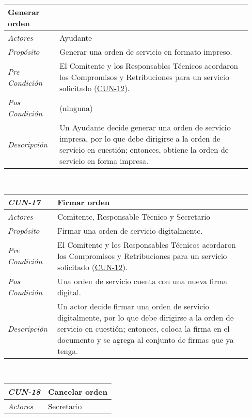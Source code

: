\begin{center}
{\begin{tabular}{ | p{3cm} | p{12.5cm} | }
	\hfil \textbf{Generar orden} \\
	\hline
	\raggedleft \textit{Actores} & Ayudante \\
	\hline
	\raggedleft \textit{Prop\'osito} & Generar una orden
	de servicio en formato impreso. \\
	\hline
	\raggedleft \textit{Pre Condici\'on} & El Comitente y
	los Responsables T\'ecnicos acordaron los Compromisos
	y Retribuciones para un servicio solicitado
	(\hyperlink{CUN-12}{CUN-12}). \\
	\hline
	\raggedleft \textit{Pos Condici\'on} & (ninguna) \\
	\hline
	\raggedleft \textit{Descripci\'on} &
	Un Ayudante decide generar una orden de servicio impresa,
	por lo que debe dirigirse a la orden de servicio en
	cuesti\'on; entonces, obtiene la orden de servicio en
	forma impresa. \\
	\hline
\end{tabular}} \\[1cm]
\hypertarget{CUN-17}{%
\begin{tabular}{ | p{3cm} | p{12.5cm} | }
	\hline
	\rowcolor{lightgray}
	\hfil \textbf{\textit{CUN-17}} &
	\hfil \textbf{Firmar orden} \\
	\hline
	\raggedleft \textit{Actores} & Comitente,
	Responsable T\'ecnico y Secretario \\
	\hline
	\raggedleft \textit{Prop\'osito} & Firmar una orden
	de servicio digitalmente. \\
	\hline
	\raggedleft \textit{Pre Condici\'on} & El Comitente y
	los Responsables T\'ecnicos acordaron los Compromisos
	y Retribuciones para un servicio solicitado
	(\hyperlink{CUN-12}{CUN-12}). \\
	\hline
	\raggedleft \textit{Pos Condici\'on} & Una orden de
	servicio cuenta con una nueva firma digital. \\
	\hline
	\raggedleft \textit{Descripci\'on} &
	Un actor decide firmar una orden de servicio digitalmente,
	por lo que debe dirigirse a la orden de servicio en
	cuesti\'on; entonces, coloca la firma en el documento
	y se agrega al conjunto de firmas que ya tenga. \\
	\hline
\end{tabular}} \\[1cm]
\hypertarget{CUN-18}{%
\begin{tabular}{ | p{3cm} | p{12.5cm} | }
	\hline
	\rowcolor{lightgray}
	\hfil \textbf{\textit{CUN-18}} &
	\hfil \textbf{Cancelar orden} \\
	\hline
	\raggedleft \textit{Actores} & Secretario \\

\end{tabular}}
\end{center}
